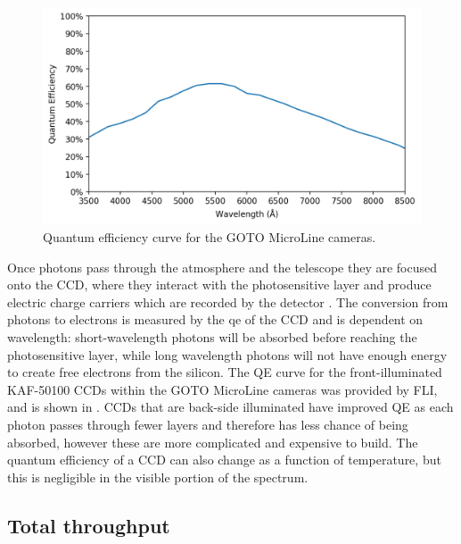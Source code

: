 \begin{colsection}
\begin{colsection}
\begin{figure}[t]
    \begin{center}
        \includegraphics[width=\textwidth]{images/throughput/qe.png}
    \end{center}
    \caption[MicroLine quantum efficiency curve]{
        Quantum efficiency curve for the GOTO MicroLine cameras.
    }\label{fig:qe}
\end{figure}

Once photons pass through the atmosphere and the telescope they are focused onto the CCD, where they interact with the photosensitive layer and produce electric charge carriers which are recorded by the detector \citep{CCDs}. The conversion from photons to electrons is measured by the \gls{qe} of the CCD and is dependent on wavelength: short-wavelength photons will be absorbed before reaching the photosensitive layer, while long wavelength photons will not have enough energy to create free electrons from the silicon. The QE curve for the front-illuminated KAF-50100 CCDs within the GOTO MicroLine cameras was provided by FLI, and is shown in . CCDs that are back-side illuminated have improved QE as each photon passes through fewer layers and therefore has less chance of being absorbed, however these are more complicated and expensive to build. The quantum efficiency of a CCD can also change as a function of temperature, but this is negligible in the visible portion of the spectrum. %

\end{colsection}

\newpage
\subsection{Total throughput}
\label{sec:total_throughput}
\begin{colsection}


\end{colsection}
\end{colsection}
